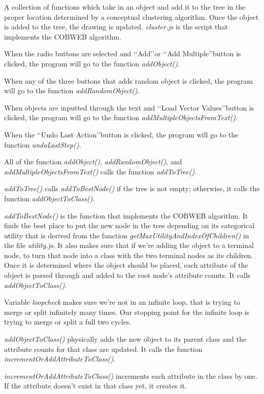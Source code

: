 A collection of functions which take in an object and add it to the tree in the proper location determined by a conceptual clustering algorithm. Once the object is added to the tree, the drawing is updated. \emph{cluster.js} is the script that implements the COBWEB algorithm.
 
 When the radio buttons are selected and \lq\lq{Add}\rq\rq or \lq\lq{Add Multiple}\rq\rq button is clicked, the program will go to the function \emph{addObject()}.
 
 When any of the three buttons that adds random object is clicked, the program will go to the function \emph{addRandomObject()}.
 
 When objects are inputted through the text and \lq\lq{Load Vector Values}\rq\rq button is clicked, the program will go to the function \emph{addMultipleObjectsFromText()}.
 
 When the \lq\lq{Undo Last Action}\rq\rq button is clicked, the program will go to the function \emph{undoLastStep()}.

All of the function \emph{addObject()}, \emph{addRandomObject()}, and \emph{addMultipleObjectsFromText()} calls the function \emph{addToTree()}.
 
\emph{addToTree()} calls \emph{addToBestNode()} if the tree is not empty; otherwise, it calls the function \emph{addObjectToClass()}.
 
\emph{addToBestNode()} is the function that implements the COBWEB algorithm. It finds the best place to put the new node in the tree depending on its categorical utility that is derived from the function \emph{getMaxUtilityAndIndexOfChildren()} in the file \emph{utility.js}. It also makes sure that if we're adding the object to a terminal node, to turn that node into a class with the two terminal nodes as its children. Once it is determined where the object should be placed, each attribute of the object is parsed through and added to the root node's attribute counts. It calls \emph{addObjectToClass()}.
 
Variable \emph{loopcheck} makes sure we're not in an infinite loop, that is trying to merge or split infinitely many times. Our stopping point for the infinite loop is trying to merge or split a full two cycles.

\emph{addObjectToClass()} physically adds the new object to its parent class and the attribute counts for that class are updated. It calls the function \emph{incrementOrAddAttributeToClass()}.
 
\emph{incrementOrAddAttributeToClass()} increments each attribute in the class by one. If the attribute doesn't exist in that class yet, it creates it.

